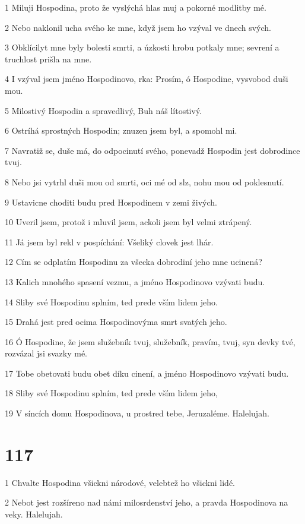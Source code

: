 \par 1 Miluji Hospodina, proto že vyslýchá hlas muj a pokorné modlitby mé.
\par 2 Nebo naklonil ucha svého ke mne, když jsem ho vzýval ve dnech svých.
\par 3 Obklícilyt mne byly bolesti smrti, a úzkosti hrobu potkaly mne; sevrení a truchlost prišla na mne.
\par 4 I vzýval jsem jméno Hospodinovo, rka: Prosím, ó Hospodine, vysvobod duši mou.
\par 5 Milostivý Hospodin a spravedlivý, Buh náš lítostivý.
\par 6 Ostríhá sprostných Hospodin; znuzen jsem byl, a spomohl mi.
\par 7 Navratiž se, duše má, do odpocinutí svého, ponevadž Hospodin jest dobrodince tvuj.
\par 8 Nebo jsi vytrhl duši mou od smrti, oci mé od slz, nohu mou od poklesnutí.
\par 9 Ustavicne choditi budu pred Hospodinem v zemi živých.
\par 10 Uveril jsem, protož i mluvil jsem, ackoli jsem byl velmi ztrápený.
\par 11 Já jsem byl rekl v pospíchání: Všeliký clovek jest lhár.
\par 12 Cím se odplatím Hospodinu za všecka dobrodiní jeho mne ucinená?
\par 13 Kalich mnohého spasení vezmu, a jméno Hospodinovo vzývati budu.
\par 14 Sliby své Hospodinu splním, ted prede vším lidem jeho.
\par 15 Drahá jest pred ocima Hospodinovýma smrt svatých jeho.
\par 16 Ó Hospodine, že jsem služebník tvuj, služebník, pravím, tvuj, syn devky tvé, rozvázal jsi svazky mé.
\par 17 Tobe obetovati budu obet díku cinení, a jméno Hospodinovo vzývati budu.
\par 18 Sliby své Hospodinu splním, ted prede vším lidem jeho,
\par 19 V síncích domu Hospodinova, u prostred tebe, Jeruzaléme. Halelujah.

\chapter{117}

\par 1 Chvalte Hospodina všickni národové, velebtež ho všickni lidé.
\par 2 Nebot jest rozšíreno nad námi milosrdenství jeho, a pravda Hospodinova na veky. Halelujah.

